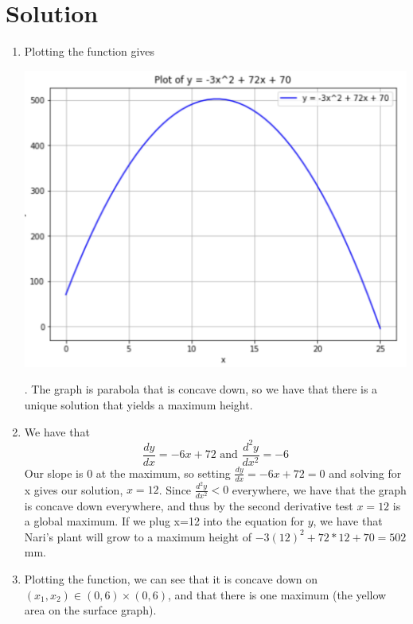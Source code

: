 \documentclass{harvardml}
\theoremstyle{definition}
\theoremstyle{plain}
\newenvironment{solution}
  {\color{blue}\section*{Solution}}
{}
\begin{document}
\begin{solution}
\begin{enumerate}
    \item Plotting the function gives \begin{center}
        \includegraphics[scale=0.45]{2.1.png}
    \end{center}. The graph is parabola that is concave down, so we have that there is a unique solution that yields a maximum height.  
    \item We have that \begin{equation*}
        \frac{dy}{dx} = -6x + 72 \text{ and } \frac{d^2y}{dx^2} = -6
    \end{equation*}
    Our slope is 0 at the maximum, so setting $\frac{dy}{dx} = -6x + 72 = 0$ and solving for x gives our solution, $x=12$. Since $\frac{d^2y}{dx^2} < 0$ everywhere, we have that the graph is concave down everywhere, and thus by the second derivative test $x=12$ is a global maximum. If we plug x=12 into the equation for $y$, we have that Nari's plant will grow to a maximum height of $-3(12)^2 + 72*12 + 70 = 502$mm. 
    \item Plotting the function, we can see that it is concave down on $(x_1,x_2) \in (0,6) \times (0,6)$, and that there is one maximum (the yellow area on the surface graph). 
    \begin{center}

\end{center}
\end{enumerate}
\end{solution}
\end{document}

